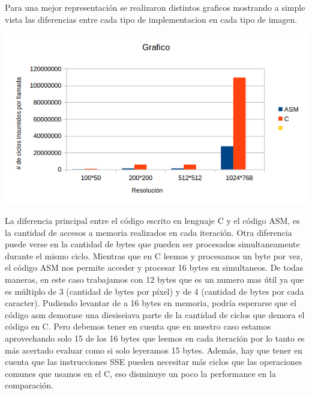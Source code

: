  Para una mejor representación se realizaron distintos graficos mostrando a simple vista
 las diferencias entre cada tipo de implementacion en cada tipo de imagen.
 \vspace*{0.3cm} \vspace*{0.3cm}
  \begin{center}
 \includegraphics[scale=1]{temperature.png}
 \end{center}
  \vspace*{0.3cm} 
La diferencia principal entre el c\'odigo escrito en lenguaje C y el c\'odigo ASM, es la cantidad de accesos 
a memoria realizados en cada iteraci\'on. Otra diferencia puede verse en la cantidad de bytes que pueden 
ser procesados simultaneamente durante el mismo ciclo. 
Mientras que en C leemos y procesamos un byte por vez, el c\'odigo ASM nos permite acceder y procesar 
16 bytes en simultaneos. De todas maneras, en este caso trabajamos con 12 bytes que es un numero mas \'util 
ya que es m\'ultiplo de 3 (cantidad de bytes por p\'ixel)  y de 4 (cantidad de bytes por cada caracter).
Pudiendo levantar de a 16 bytes en memoria, podr\'ia esperarse que el c\'odigo asm demorase una 
diesiseiava parte de la cantidad de ciclos que demora el c\'odigo en C.
Pero debemos tener en cuenta que en nuestro caso estamos aprovechando solo 15 de los 16 bytes que leemos 
en cada iteraci\'on por lo tanto es más acertado evaluar como si solo leyeramos 15 bytes. 
Adem\'as, hay que tener en cuenta que las instrucciones SSE pueden necesitar más ciclos que las operaciones 
comunes que usamos en el C, eso disminuye un poco la performance en la comparación. 
\vspace*{0.3cm} \vspace*{0.3cm} 
 
 
